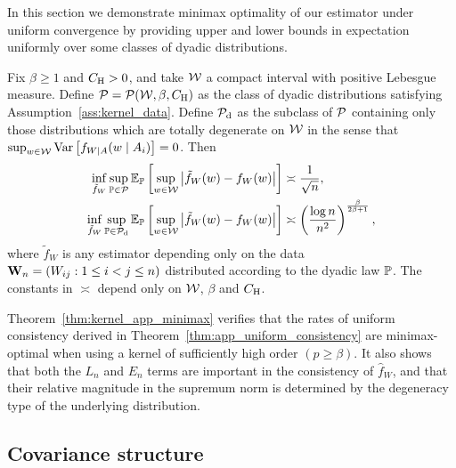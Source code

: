In this section we demonstrate
minimax optimality of our estimator under uniform convergence
by providing upper and lower bounds in expectation uniformly over
some classes of dyadic distributions.
\begin{theorem}
  \label{thm:kernel_app_minimax}

  Fix $\beta \geq 1$ and $\CH > 0$,
  and take $\cW$ a compact interval with
  positive Lebesgue measure.
  Define $\cP = \cP(\cW, \beta, \CH)$
  as the class of dyadic distributions
  satisfying Assumption~\ref{ass:kernel_data}.
  Define $\cPd$ as the subclass of $\cP$
  containing only those distributions
  which are totally degenerate on $\cW$ in the sense that
  $\sup_{w \in \cW} \Var\left[f_{W \mid A}(w \mid A_i)\right] = 0$.
  Then
  \begin{align*}
    \inf_{\tilde f_W}
    \sup_{\P \in \cP}
    \E_\P\left[
      \sup_{w \in \cW}
      \big|
      \tilde f_W(w) - f_W(w)
      \big|
    \right]
    &\asymp
    \frac{1}{\sqrt n}, \\
    \inf_{\tilde f_W}
    \sup_{\P \in \cPd}
    \E_\P\left[
      \sup_{w \in \cW}
      \big|
      \tilde f_W(w) - f_W(w)
      \big|
    \right]
    &\asymp
    \left(
      \frac{\log n}{n^2}
    \right)^{\frac{\beta}{2\beta+1}},
  \end{align*}
  where $\tilde f_W$ is any estimator depending only on
  the data $\bW_n = (W_{ij}: 1 \leq i < j \leq n)$
  distributed according to the dyadic law $\P$.
  The constants in $\asymp$ depend only on
  $\cW$, $\beta$ and $\CH$.

\end{theorem}

\begin{remark}

  Theorem~\ref{thm:kernel_app_minimax}
  verifies that the rates of uniform consistency derived
  in Theorem~\ref{thm:app_uniform_consistency}
  are minimax-optimal when using a kernel of sufficiently high order
  $(p \geq \beta)$.
  It also shows that both the
  $L_n$ and $E_n$ terms are important
  in the consistency of $\hat f_W$,
  and that their relative magnitude
  in the supremum norm is determined
  by the degeneracy type of the underlying distribution.

\end{remark}

\subsection{Covariance structure}

